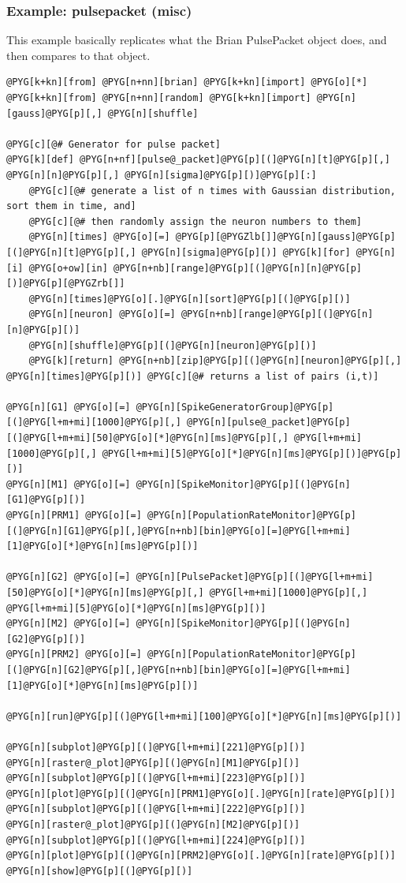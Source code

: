 \documentclass[letterpaper,10pt,english]{manual}
\begin{document}
\hypertarget{index-62}{}\subsubsection{Example: pulsepacket (misc)}

This example basically replicates what the Brian PulsePacket object does,
and then compares to that object.

\begin{Verbatim}[commandchars=@\[\]]
@PYG[k+kn][from] @PYG[n+nn][brian] @PYG[k+kn][import] @PYG[o][*]
@PYG[k+kn][from] @PYG[n+nn][random] @PYG[k+kn][import] @PYG[n][gauss]@PYG[p][,] @PYG[n][shuffle]

@PYG[c][@# Generator for pulse packet]
@PYG[k][def] @PYG[n+nf][pulse@_packet]@PYG[p][(]@PYG[n][t]@PYG[p][,] @PYG[n][n]@PYG[p][,] @PYG[n][sigma]@PYG[p][)]@PYG[p][:]
    @PYG[c][@# generate a list of n times with Gaussian distribution, sort them in time, and]
    @PYG[c][@# then randomly assign the neuron numbers to them]
    @PYG[n][times] @PYG[o][=] @PYG[p][@PYGZlb[]]@PYG[n][gauss]@PYG[p][(]@PYG[n][t]@PYG[p][,] @PYG[n][sigma]@PYG[p][)] @PYG[k][for] @PYG[n][i] @PYG[o+ow][in] @PYG[n+nb][range]@PYG[p][(]@PYG[n][n]@PYG[p][)]@PYG[p][@PYGZrb[]]
    @PYG[n][times]@PYG[o][.]@PYG[n][sort]@PYG[p][(]@PYG[p][)]
    @PYG[n][neuron] @PYG[o][=] @PYG[n+nb][range]@PYG[p][(]@PYG[n][n]@PYG[p][)]
    @PYG[n][shuffle]@PYG[p][(]@PYG[n][neuron]@PYG[p][)]
    @PYG[k][return] @PYG[n+nb][zip]@PYG[p][(]@PYG[n][neuron]@PYG[p][,] @PYG[n][times]@PYG[p][)] @PYG[c][@# returns a list of pairs (i,t)]

@PYG[n][G1] @PYG[o][=] @PYG[n][SpikeGeneratorGroup]@PYG[p][(]@PYG[l+m+mi][1000]@PYG[p][,] @PYG[n][pulse@_packet]@PYG[p][(]@PYG[l+m+mi][50]@PYG[o][*]@PYG[n][ms]@PYG[p][,] @PYG[l+m+mi][1000]@PYG[p][,] @PYG[l+m+mi][5]@PYG[o][*]@PYG[n][ms]@PYG[p][)]@PYG[p][)]
@PYG[n][M1] @PYG[o][=] @PYG[n][SpikeMonitor]@PYG[p][(]@PYG[n][G1]@PYG[p][)]
@PYG[n][PRM1] @PYG[o][=] @PYG[n][PopulationRateMonitor]@PYG[p][(]@PYG[n][G1]@PYG[p][,]@PYG[n+nb][bin]@PYG[o][=]@PYG[l+m+mi][1]@PYG[o][*]@PYG[n][ms]@PYG[p][)]

@PYG[n][G2] @PYG[o][=] @PYG[n][PulsePacket]@PYG[p][(]@PYG[l+m+mi][50]@PYG[o][*]@PYG[n][ms]@PYG[p][,] @PYG[l+m+mi][1000]@PYG[p][,] @PYG[l+m+mi][5]@PYG[o][*]@PYG[n][ms]@PYG[p][)]
@PYG[n][M2] @PYG[o][=] @PYG[n][SpikeMonitor]@PYG[p][(]@PYG[n][G2]@PYG[p][)]
@PYG[n][PRM2] @PYG[o][=] @PYG[n][PopulationRateMonitor]@PYG[p][(]@PYG[n][G2]@PYG[p][,]@PYG[n+nb][bin]@PYG[o][=]@PYG[l+m+mi][1]@PYG[o][*]@PYG[n][ms]@PYG[p][)]

@PYG[n][run]@PYG[p][(]@PYG[l+m+mi][100]@PYG[o][*]@PYG[n][ms]@PYG[p][)]

@PYG[n][subplot]@PYG[p][(]@PYG[l+m+mi][221]@PYG[p][)]
@PYG[n][raster@_plot]@PYG[p][(]@PYG[n][M1]@PYG[p][)]
@PYG[n][subplot]@PYG[p][(]@PYG[l+m+mi][223]@PYG[p][)]
@PYG[n][plot]@PYG[p][(]@PYG[n][PRM1]@PYG[o][.]@PYG[n][rate]@PYG[p][)]
@PYG[n][subplot]@PYG[p][(]@PYG[l+m+mi][222]@PYG[p][)]
@PYG[n][raster@_plot]@PYG[p][(]@PYG[n][M2]@PYG[p][)]
@PYG[n][subplot]@PYG[p][(]@PYG[l+m+mi][224]@PYG[p][)]
@PYG[n][plot]@PYG[p][(]@PYG[n][PRM2]@PYG[o][.]@PYG[n][rate]@PYG[p][)]
@PYG[n][show]@PYG[p][(]@PYG[p][)]
\end{Verbatim}
\end{document}
